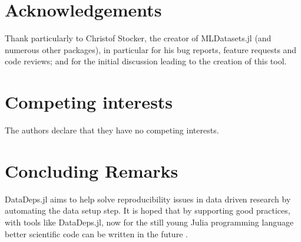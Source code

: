 \documentclass[dvinames]{josr}
\begin{document}
\section*{Acknowledgements}
Thank particularly to Christof Stocker, the creator of MLDatasets.jl (and numerous other packages), in particular for his bug reports, feature requests and code reviews; and for the initial discussion leading to the creation of this tool.


\section*{Competing interests}
The authors declare that they have no competing interests.

\section {Concluding Remarks} 
DataDeps.jl aims to help solve reproducibility issues in data driven research by automating the data setup step. 
It is hoped that by supporting good practices, with tools like DataDeps.jl, now for the still young Julia programming language 
better scientific code can be written in the future . 

\newpage




%
%
%
%
%
%
%
\end{document}
